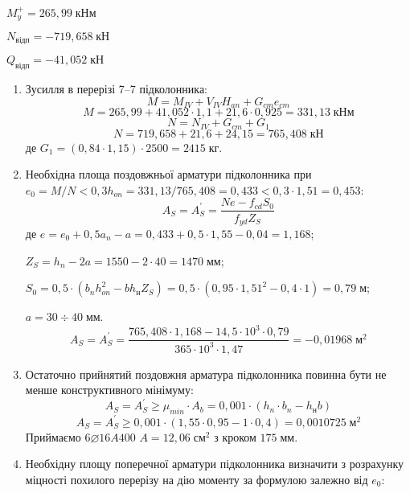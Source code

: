 \documentclass[a4paper,14pt]{article}
\begin{document}
        $M_y^+ = 265,99\;\textit{кНм}$
        
        $N_{\textit{відп}} = - 719,658\;\textit{кН}$
   
        $Q_{\textit{відп}} = - 41,052\;\textit{кН}$
\begin{enumerate}
    \item Зусилля в перерізі 7–7 підколонника:
        \begin{equation}
            M = M_{IV} + V_{IV}H_{an} + G_{cm}e_{cm}
        \end{equation}
        $$M = 265,99 + 41,052 \cdot 1,1 + 21,6 \cdot 0,925 = 331,13\;\textit{кНм}$$
        \begin{equation}
            N = N_{IV} + G_{cm} + G_1
        \end{equation}
        $$N = 719,658 + 21,6 + 24,15 = 765,408\;\textit{кН}$$
        де $G_1 = (0,84 \cdot 1,15) \cdot 2500 = 2415\;\textit{кг}$.
    \item Необхідна площа поздовжньої арматури підколонника при\\$e_0 = M / N < 0,3h_{on} = 331,13 / 765,408 = 0,433 < 0,3 \cdot 1,51 = 0,453$:
        \begin{equation}
            A_S = A_S^{\prime} = \dfrac{Ne - f_{cd}S_0}{f_{yd}Z_S}
        \end{equation}
        де $e = e_0 + 0,5a_n - a = 0,433 + 0,5 \cdot 1,55 - 0,04 = 1,168$;

        $Z_S = h_n - 2a = 1550 - 2 \cdot 40 = 1470\;\textit{мм}$;

        $S_0 = 0,5 \cdot (b_nh_{on}^2 - bh_{\textit{н}}Z_S) = 0,5 \cdot (0,95 \cdot 1,51^2 - 0,4 \cdot 1) = 0,79\;\textit{м}$;

        $a = 30 \div 40\;\textit{мм}$.
        $$A_S = A_S^{\prime} = \dfrac{765,408 \cdot 1,168 - 14,5 \cdot 10^3 \cdot 0,79}{365 \cdot 10^3 \cdot 1,47} = - 0,01968\;\textit{м}^2$$
    \item Остаточно прийнятий поздовжня арматура підколонника повинна бути не менше конструктивного мінімуму:
        \begin{equation}
            A_S = A_S^{\prime} \geq \mu_{min} \cdot A_b = 0,001 \cdot (h_n \cdot b_n - h_{\textit{н}}b)
        \end{equation}
        $$A_S = A_S^{\prime} \geq 0,001 \cdot (1,55 \cdot 0,95 - 1 \cdot 0,4) = 0,0010725\;\textit{м}^2$$
        Приймаємо $6\varnothing16A400$ $A = 12,06\;\textit{см}^2$ з кроком $175\;\textit{мм}$.
    \item Необхідну площу поперечної арматури підколонника визначити з розрахунку міцності похилого перерізу на дію моменту за формулою залежно від $e_0$:
    

\end{enumerate}
\end{document}
